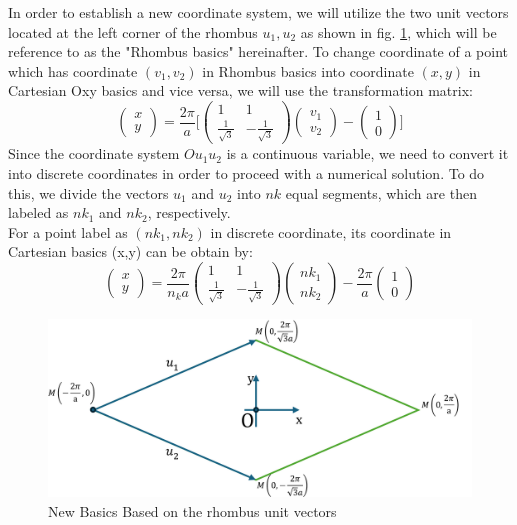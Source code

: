 \documentclass[12pt,english,a4paper]{article}
\begin{document}
\quad In order to establish a new coordinate system, we will utilize the two unit vectors located at the left corner of the rhombus $u_1, u_2$ as shown in fig. \ref{rhombuskgrid}, which will be reference to as the "Rhombus basics" hereinafter. To change coordinate of a point which has coordinate $(v_1,v_2)$ in Rhombus basics into coordinate $(x,y)$ in Cartesian Oxy basics and vice versa, we will use the transformation matrix:
\begin{equation}
	\begin{pmatrix} x \\ y \end{pmatrix}
	= \frac{2\pi}{a} \biggl[\begin{pmatrix}
		1 & 1\\ \frac{1}{\sqrt{3}} & -\frac{1}{\sqrt{3}}\end{pmatrix}
		\begin{pmatrix} v_1 \\v_2\end{pmatrix}
		-\begin{pmatrix} 1 \\ 0\end{pmatrix}\biggr]
\end{equation}
\quad Since the coordinate system $Ou_1 u_2$ is a continuous variable, we need to convert it into discrete coordinates in order to proceed with a numerical solution. To do this, we divide the vectors $u_1$ and $u_2$ into $nk$ equal segments, which are then labeled as $nk_1$ and $nk_2$, respectively.\\\null
\quad For a point label as $(nk_1,nk_2)$ in discrete coordinate, its coordinate in Cartesian basics (x,y) can be obtain by:
\begin{equation}
	\begin{pmatrix} x \\ y \end{pmatrix}
	= \frac{2\pi}{n_ka} \begin{pmatrix}
		1 & 1\\ \frac{1}{\sqrt{3}} & -\frac{1}{\sqrt{3}}\end{pmatrix}
	\begin{pmatrix} nk_1 \\nk_2\end{pmatrix}
	-\frac{2\pi}{a}\begin{pmatrix} 1 \\ 0\end{pmatrix}
\end{equation}
\begin{figure}
	\begin{center}
		\includegraphics[width=0.5\linewidth]{Images/rhombuskgrid.pdf}
		\caption{New Basics Based on the rhombus unit vectors}
		\label{rhombuskgrid}
	\end{center}
\end{figure}
\end{document}
